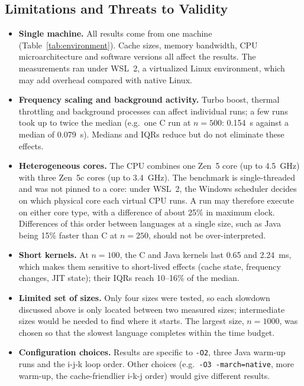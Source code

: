 \documentclass[conference,a4paper]{IEEEtran}
\newcommand{\code}[1]{\texttt{#1}}
\begin{document}
\subsection{Limitations and Threats to Validity}
\begin{itemize}[itemsep=1pt]
  \item \textbf{Single machine.} All results come from one machine
        (Table~\ref{tab:environment}). Cache sizes, memory bandwidth, CPU
        microarchitecture and software versions all affect the results.
        The measurements ran under WSL~2, a virtualized Linux environment,
        which may add overhead compared with native Linux.
  \item \textbf{Frequency scaling and background activity.} Turbo boost,
        thermal throttling and background processes can affect individual
        runs; a few runs took up to twice the median (e.g.\ one C run at
        $n=500$: 0.154~s against a median of 0.079~s). Medians and IQRs reduce
        but do not eliminate these effects.
  \item \textbf{Heterogeneous cores.} The CPU combines one Zen~5 core (up to
        4.5~GHz) with three Zen~5c cores (up to 3.4~GHz). The benchmark is
        single-threaded and was not pinned to a core: under WSL~2, the Windows
        scheduler decides on which physical core each virtual CPU runs. A run
        may therefore execute on either core type, with a difference of about
        25\% in maximum clock. Differences of this order between languages at
        a single size, such as Java being 15\% faster than C at $n=250$,
        should not be over-interpreted.
  \item \textbf{Short kernels.} At $n=100$, the C and Java kernels last
        0.65 and 2.24~ms, which makes them sensitive to short-lived effects
        (cache state, frequency changes, JIT state); their IQRs reach 10--16\%
        of the median.
  \item \textbf{Limited set of sizes.} Only four sizes were tested, so each
        slowdown discussed above is only located between two measured sizes;
        intermediate sizes would be needed to find where it starts. The
        largest size, $n=1000$, was chosen so that the slowest language
        completes within the time budget.
  \item \textbf{Configuration choices.} Results are specific to \code{-O2},
        three Java warm-up runs and the i-j-k loop order. Other choices (e.g.\
        \code{-O3 -march=native}, more warm-up, the cache-friendlier i-k-j order)
        would give different results.
\end{itemize}
\end{document}

